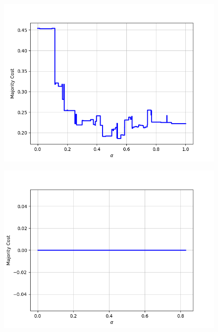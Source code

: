 \begin{figure}[h]
\begin{minipage}{.24\textwidth}
\end{minipage}
\begin{minipage}{.24\textwidth}
  \centering
  {\includegraphics[width=\linewidth]{plots/nell-ac/attraction}}
\end{minipage}
\begin{minipage}{.24\textwidth}
  \centering
  {\includegraphics[width=\linewidth]{plots/nell-ac/beverage}}
\end{minipage}
\begin{minipage}{.24\textwidth}
  \centering

\end{minipage}
\end{figure}
